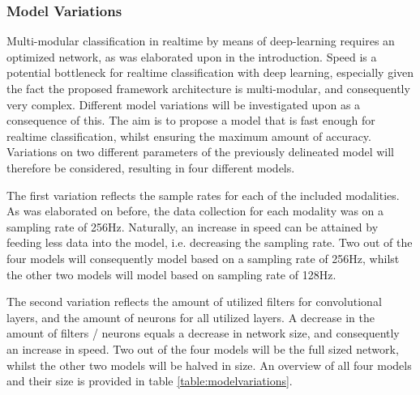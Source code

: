 \documentclass[12pt]{article}
\begin{document}
\subsubsection{Model Variations}
Multi-modular classification in realtime by means of deep-learning requires an optimized network, as was elaborated upon in the introduction. Speed is a potential bottleneck for realtime classification with deep learning, especially given the fact the proposed framework architecture is multi-modular, and consequently very complex. Different model variations will be investigated upon as a consequence of this. The aim is to propose a model that is fast enough for realtime classification, whilst ensuring the maximum amount of accuracy. Variations on two different parameters of the previously delineated model will therefore be considered, resulting in four different models. 

The first variation reflects the sample rates for each of the included modalities. As was elaborated on before, the data collection for each modality was on a sampling rate of 256Hz. Naturally, an increase in speed can be attained by feeding less data into the model, i.e. decreasing the sampling rate. Two out of the four models will consequently model based on a sampling rate of 256Hz, whilst the other two models will model based on sampling rate of 128Hz. 

The second variation reflects the amount of utilized filters for convolutional layers, and the amount of neurons for all utilized layers. A decrease in the amount of filters / neurons equals a decrease in network size, and consequently an increase in speed. Two out of the four models will be the full sized network, whilst the other two models will be halved in size. An overview of all four models and their size is provided in table \ref{table:modelvariations}.
\bigskip
\end{document}
